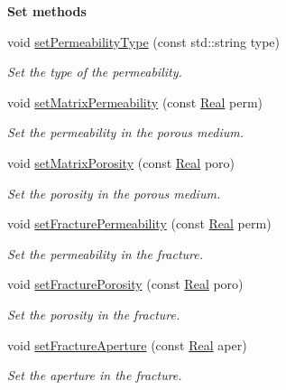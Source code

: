 \begin{Indent}{\bf Set methods}
\begin{DoxyCompactItemize}
void \hyperlink{classFVCode3D_1_1Data_a72079afa3a831af937b1665b4ef3e048}{set\+Permeability\+Type} (const std\+::string type)
\begin{DoxyCompactList}\small\item\em Set the type of the permeability. \end{DoxyCompactList}\item 
void \hyperlink{classFVCode3D_1_1Data_a5e0006a4cb8cb2fbb0f6bf3d55ea97f6}{set\+Matrix\+Permeability} (const \hyperlink{namespaceFVCode3D_a40c1f5588a248569d80aa5f867080e83}{Real} perm)
\begin{DoxyCompactList}\small\item\em Set the permeability in the porous medium. \end{DoxyCompactList}\item 
void \hyperlink{classFVCode3D_1_1Data_ac69940093fb72d43599771f4ffd2a3d8}{set\+Matrix\+Porosity} (const \hyperlink{namespaceFVCode3D_a40c1f5588a248569d80aa5f867080e83}{Real} poro)
\begin{DoxyCompactList}\small\item\em Set the porosity in the porous medium. \end{DoxyCompactList}\item 
void \hyperlink{classFVCode3D_1_1Data_ae30cd878d556d3167cbfd298e550cdd0}{set\+Fracture\+Permeability} (const \hyperlink{namespaceFVCode3D_a40c1f5588a248569d80aa5f867080e83}{Real} perm)
\begin{DoxyCompactList}\small\item\em Set the permeability in the fracture. \end{DoxyCompactList}\item 
void \hyperlink{classFVCode3D_1_1Data_a8ebf93476e0386bc114fbcdb68d4a824}{set\+Fracture\+Porosity} (const \hyperlink{namespaceFVCode3D_a40c1f5588a248569d80aa5f867080e83}{Real} poro)
\begin{DoxyCompactList}\small\item\em Set the porosity in the fracture. \end{DoxyCompactList}\item 
void \hyperlink{classFVCode3D_1_1Data_a1967ff12ee9142fd118f952a0f9cb7a3}{set\+Fracture\+Aperture} (const \hyperlink{namespaceFVCode3D_a40c1f5588a248569d80aa5f867080e83}{Real} aper)
\begin{DoxyCompactList}\small\item\em Set the aperture in the fracture. \end{DoxyCompactList}\item 

\end{DoxyCompactItemize}
\end{Indent}
